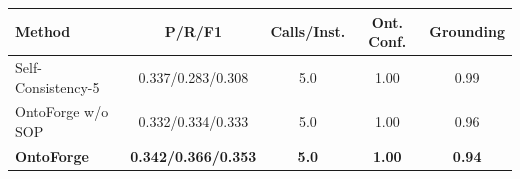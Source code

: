 \begin{tabular}{lcccc}
\toprule
Method & P/R/F1 & Calls/Inst. & Ont. Conf. & Grounding \\
\midrule
Self-Consistency-5 & 0.337/0.283/0.308 & 5.0 & 1.00 & 0.99 \\
OntoForge w/o SOP & 0.332/0.334/0.333 & 5.0 & 1.00 & 0.96 \\
\midrule
\textbf{OntoForge} & \textbf{0.342/0.366/0.353} & \textbf{5.0} & \textbf{1.00} & \textbf{0.94} \\
\bottomrule
\end{tabular}
